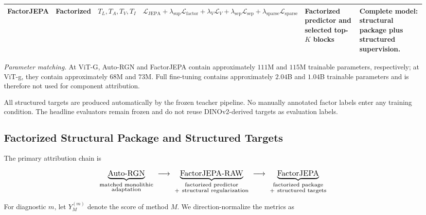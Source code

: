 \begin{table}[t]
\begin{tabularx}{\textwidth}{
    p{}
    p{}
    p{}
    p{}
    p{}
    X
}
\rowcolor{AttrTeal}
\textbf{FactorJEPA}
&
Factorized
&
\(T_L,T_A,T_V,T_I\)
&
\(\mathcal L_{\mathrm{JEPA}}
+\lambda_{\mathrm{sup}}\mathcal L_{\mathrm{factor}}
+\lambda_V\mathcal L_V
+\lambda_{\mathrm{sep}}\mathcal L_{\mathrm{sep}}
+\lambda_{\mathrm{sparse}}\mathcal L_{\mathrm{sparse}}\)
&
Factorized predictor and selected top-\(K\) blocks
&
Complete model: structural package plus structured supervision.
\\

\bottomrule
\end{tabularx}

\vspace{2pt}
\parbox{0.97\textwidth}{
\textit{Parameter matching.}
At ViT-G, Auto-RGN and FactorJEPA contain approximately \(111\)M
and \(115\)M trainable parameters, respectively; at ViT-g, they contain
approximately \(68\)M and \(73\)M. Full fine-tuning contains
approximately \(2.04\)B and \(1.04\)B trainable parameters and is
therefore not used for component attribution.
}
\end{table}

All structured targets are produced automatically by the frozen
teacher pipeline. No manually annotated factor labels enter any
training condition. The headline evaluators remain frozen and do not
reuse DINOv2-derived targets as evaluation labels.


\subsection{Factorized Structural Package and Structured Targets}
\label{app:attribution_primary}

The primary attribution chain is

\begin{equation*}
\resizebox{0.97\columnwidth}{!}{$\displaystyle
\underbrace{\text{Auto-RGN}}_{\substack{\text{matched monolithic}\\
\text{adaptation}}}
\;\longrightarrow\;
\underbrace{\text{FactorJEPA-RAW}}_{\substack{\text{factorized predictor}\\
+\ \text{structural regularization}}}
\;\longrightarrow\;
\underbrace{\text{FactorJEPA}}_{\substack{\text{factorized package}\\
+\ \text{structured targets}}}
$}
\end{equation*}

For diagnostic \(m\), let \(Y_M^{(m)}\) denote the score of method
\(M\). We direction-normalize the metrics as

